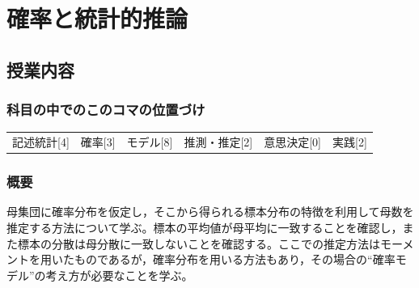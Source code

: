 \section{確率と統計的推論}
\label{D1_lesson16}

\subsection{授業内容}
\subsubsection{科目の中でのこのコマの位置づけ}
\begin{tabular}[t]{cccccc}
    記述統計[4] & 確率[3] & モデル[8] & 推測・推定[2] & 意思決定[0] & 実践[2]
\end{tabular}
\subsubsection{概要}
母集団に確率分布を仮定し，そこから得られる標本分布の特徴を利用して母数を推定する方法について学ぶ。標本の平均値が母平均に一致することを確認し，また標本の分散は母分散に一致しないことを確認する。ここでの推定方法はモーメントを用いたものであるが，確率分布を用いる方法もあり，その場合の``確率モデル''の考え方が必要なことを学ぶ。
